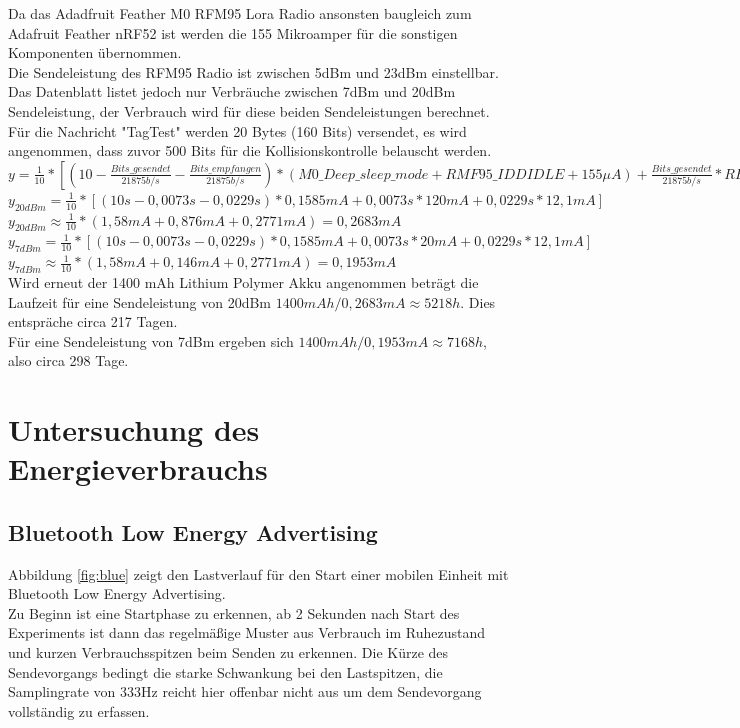 Da das Adadfruit Feather M0 RFM95 Lora Radio ansonsten baugleich zum Adafruit Feather nRF52 ist werden die 155 Mikroamper für die sonstigen Komponenten übernommen.\\
Die Sendeleistung des RFM95 Radio ist zwischen 5dBm und 23dBm einstellbar. 
Das Datenblatt listet jedoch nur Verbräuche zwischen 7dBm und 20dBm Sendeleistung, der Verbrauch wird für diese beiden Sendeleistungen berechnet.
Für die Nachricht "TagTest" werden 20 Bytes (160 Bits) versendet, es wird angenommen, dass zuvor 500 Bits für die Kollisionskontrolle belauscht werden.\\[1cm]

$y = \frac{1}{10} * [(10 - \frac{Bits\_gesendet}{21875 b/s} - \frac{Bits\_empfangen}{21875 b/s}) * (M0\_Deep\_sleep\_mode + RMF95\_IDDIDLE + 155 {\mu}A) + \frac{Bits\_gesendet}{21875 b/s} * RFM95\_XdBm + \frac{Bits\_empfangen}{21875 b/s} * RFM95\_IDDR]$\\[0.5cm]
$y_{20dBm} = \frac{1}{10} * [(10s - 0,0073s - 0,0229s) * 0,1585mA + 0,0073s * 120mA + 0,0229s * 12,1mA]$\\[0.5cm]
$y_{20dBm} \approx \frac{1}{10} * (1,58mA + 0,876mA + 0,2771mA) = 0,2683mA$\\[1cm]

$y_{7dBm} = \frac{1}{10} * [(10s - 0,0073s - 0,0229s) * 0,1585mA + 0,0073s * 20mA + 0,0229s * 12,1mA]$\\[0.5cm]
$y_{7dBm} \approx \frac{1}{10} * (1,58mA + 0,146mA + 0,2771mA) = 0,1953mA$\\[1cm]

Wird erneut der 1400 mAh Lithium Polymer Akku angenommen beträgt die Laufzeit für eine Sendeleistung von 20dBm $1400mAh / 0,2683mA \approx 5218h$.
Dies entspräche circa 217 Tagen.\\
Für eine Sendeleistung von 7dBm ergeben sich $1400mAh / 0,1953mA \approx 7168h$, also circa 298 Tage.


\section{Untersuchung des Energieverbrauchs}
\subsection{Bluetooth Low Energy Advertising}
\label{ch:realworld:sec:ble}
Abbildung \ref{fig:blue} zeigt den Lastverlauf für den Start einer mobilen Einheit mit Bluetooth Low Energy Advertising.\\
Zu Beginn ist eine Startphase zu erkennen, ab 2 Sekunden nach Start des Experiments ist dann das regelmäßige Muster aus Verbrauch im Ruhezustand und kurzen Verbrauchsspitzen beim Senden zu erkennen.
Die Kürze des Sendevorgangs bedingt die starke Schwankung bei den Lastspitzen, die Samplingrate von 333Hz reicht hier offenbar nicht aus um dem Sendevorgang vollständig zu erfassen.\\

